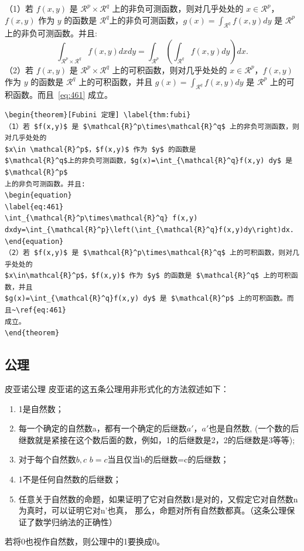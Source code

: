 \documentclass[../book.tex]{subfiles}
\begin{document}
\begin{theorem}[Fubini 定理] \label{thm:fubi}
（1）若 $f(x,y)$ 是 $\mathcal{R}^p\times\mathcal{R}^q$ 上的非负可测函数，则对几乎处处的
$x\in \mathcal{R}^p$，$f(x,y)$ 作为 $y$ 的函数是
$\mathcal{R}^q$上的非负可测函数，$g(x)=\int_{\mathcal{R}^q}f(x,y) dy$ 是 $\mathcal{R}^p$
上的非负可测函数。并且:
\begin{equation}
\label{eq:461}
\int_{\mathcal{R}^p\times\mathcal{R}^q} f(x,y)
dxdy=\int_{\mathcal{R}^p}\left(\int_{\mathcal{R}^q}f(x,y)dy\right)dx.
\end{equation}
（2）若 $f(x,y)$ 是 $\mathcal{R}^p\times\mathcal{R}^q$ 上的可积函数，则对几乎处处的
$x\in\mathcal{R}^p$，$f(x,y)$ 作为 $y$ 的函数是 $\mathcal{R}^q$ 上的可积函数，并且
$g(x)=\int_{\mathcal{R}^q}f(x,y) dy$ 是 $\mathcal{R}^p$ 上的可积函数。而且~\ref{eq:461}
成立。
\end{theorem}

\begin{lstlisting}
\begin{theorem}[Fubini 定理] \label{thm:fubi}
（1）若 $f(x,y)$ 是 $\mathcal{R}^p\times\mathcal{R}^q$ 上的非负可测函数，则对几乎处处的
$x\in \mathcal{R}^p$，$f(x,y)$ 作为 $y$ 的函数是
$\mathcal{R}^q$上的非负可测函数，$g(x)=\int_{\mathcal{R}^q}f(x,y) dy$ 是 $\mathcal{R}^p$
上的非负可测函数。并且:
\begin{equation}
\label{eq:461}
\int_{\mathcal{R}^p\times\mathcal{R}^q} f(x,y)
dxdy=\int_{\mathcal{R}^p}\left(\int_{\mathcal{R}^q}f(x,y)dy\right)dx.
\end{equation}
（2）若 $f(x,y)$ 是 $\mathcal{R}^p\times\mathcal{R}^q$ 上的可积函数，则对几乎处处的
$x\in\mathcal{R}^p$，$f(x,y)$ 作为 $y$ 的函数是 $\mathcal{R}^q$ 上的可积函数，并且
$g(x)=\int_{\mathcal{R}^q}f(x,y) dy$ 是 $\mathcal{R}^p$ 上的可积函数。而且~\ref{eq:461}
成立。
\end{theorem}
\end{lstlisting}

    \subsection{公理}

\begin{axiom}{皮亚诺公理}
皮亚诺的这五条公理用非形式化的方法叙述如下：
\begin{enumerate}
\item 1是自然数；
\item 每一个确定的自然数a，都有一个确定的后继数$a'$，$a'$也是自然数,
(一个数的后继数就是紧接在这个数后面的数，例如，1的后继数是2，2的后继数是3等等);
\item 对于每个自然数$b,c$ $b=c$当且仅当b的后继数=c的后继数；
\item 1不是任何自然数的后继数；
\item
任意关于自然数的命题，如果证明了它对自然数1是对的，又假定它对自然数n为真时，可以证明它对n'也真，
那么，命题对所有自然数都真。（这条公理保证了数学归纳法的正确性）
\end{enumerate}
若将0也视作自然数，则公理中的1要换成0。
\end{axiom}
\end{document}
